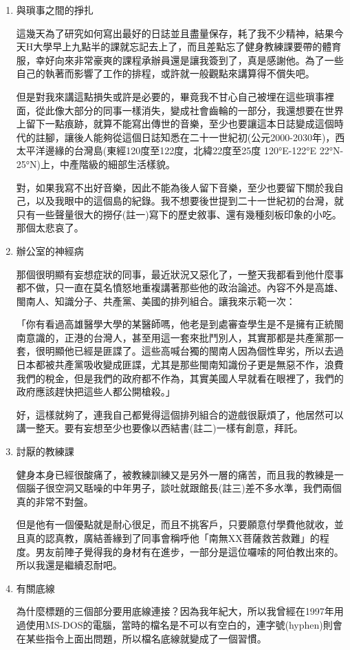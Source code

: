 \documentclass[
]{article}
\begin{document}
\begin{enumerate}
\def\labelenumi{\arabic{enumi}.}
\item
  與瑣事之間的掙扎

  這幾天為了研究如何寫出最好的日誌並且盡量保存，耗了我不少精神，結果今天H大學早上九點半的課就忘記去上了，而且差點忘了健身教練課要帶的體育服，幸好向來非常豪爽的課程承辦員還是讓我簽到了，真是感謝他。為了一些自己的執著而影響了工作的排程，或許就一般觀點來講算得不償失吧。

  但是對我來講這點損失或許是必要的，畢竟我不甘心自己被埋在這些瑣事裡面，從此像大部分的同事一樣消失，變成社會齒輪的一部分，我還想要在世界上留下一點痕跡，就算不能寫出傳世的音樂，至少也要讓這本日誌變成這個時代的註腳，讓後人能夠從這個日誌知悉在二十一世紀初(公元2000-2030年)，西太平洋邊緣的台灣島(東經120度至122度，北緯22度至25度
  120°E-122°E 22°N-25°N)上，中產階級的細部生活樣貌。

  對，如果我寫不出好音樂，因此不能為後人留下音樂，至少也要留下關於我自己，以及我眼中的這個島的紀錄。我不想要後世提到二十一世紀初的台灣，就只有一些聲量很大的撈仔(註一)寫下的歷史敘事、還有幾種刻板印象的小吃。那個太悲哀了。
\item
  辦公室的神經病

  那個很明顯有妄想症狀的同事，最近狀況又惡化了，一整天我都看到他什麼事都不做，只一直在莫名憤怒地重複講著那些他的政治論述。內容不外是高雄、閩南人、知識分子、共產黨、美國的排列組合。讓我來示範一次：

  「你有看過高雄醫學大學的某醫師嗎，他老是到處審查學生是不是擁有正統閩南意識的，正港的台灣人，甚至用這一套來批鬥別人，其實那都是共產黨那一套，很明顯他已經是匪諜了。這些高喊台獨的閩南人因為個性卑劣，所以去過日本都被共產黨吸收變成匪諜，尤其是那些閩南知識份子更是無惡不作，浪費我們的稅金，但是我們的政府都不作為，其實美國人早就看在眼裡了，我們的政府應該趕快把這些人都公開槍殺。」

  好，這樣就夠了，連我自己都覺得這個排列組合的遊戲很厭煩了，他居然可以講一整天。要有妄想至少也要像以西結書(註二)一樣有創意，拜託。
\item
  討厭的教練課

  健身本身已經很酸痛了，被教練訓練又是另外一層的痛苦，而且我的教練是一個腦子很空洞又聒噪的中年男子，談吐就跟館長(註三)差不多水準，我們兩個真的非常不對盤。

  但是他有一個優點就是耐心很足，而且不挑客戶，只要願意付學費他就收，並且真的認真教，廣結善緣到了同事會稱呼他「南無XX菩薩救苦救難」的程度。男友前陣子覺得我的身材有在進步，一部分是這位囉嗦的阿伯教出來的。所以我還是繼續忍耐吧。
\item
  有關底線

  為什麼標題的三個部分要用底線連接？因為我年紀大，所以我曾經在1997年用過使用MS-DOS的電腦，當時的檔名是不可以有空白的，連字號(hyphen)則會在某些指令上面出問題，所以檔名底線就變成了一個習慣。
\end{enumerate}
\end{document}
